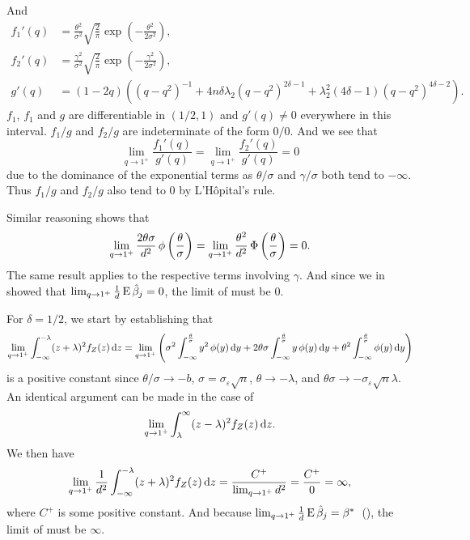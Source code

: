 And
\begin{align*}
  f_1'(q) & = \frac{\theta^2}{\sigma^2}\sqrt{\frac{2}{\pi}}\exp\left(-\frac{\theta^2}{2\sigma^2}\right),                                    \\
  f_2'(q) & = \frac{\gamma^2}{\sigma^2}\sqrt{\frac{2}{\pi}}\exp\left(-\frac{\gamma^2}{2\sigma^2}\right),                                    \\
  g'(q)   & = (1-2q)\left((q-q^2)^{-1} + 4n\delta \lambda_2 (q-q^2)^{2\delta - 1} + \lambda_2^2 (4 \delta - 1)(q-q^2)^{4\delta - 2}\right).
\end{align*}
\(f_1\), \(f_1\) and \(g\) are differentiable in \((1/2, 1)\) and \(g'(q) \neq 0\) everywhere in this interval. \(f_1/g\) and \(f_2/g\) are indeterminate of the form \(0/0\). And we see that
\[
  \lim_{q \rightarrow 1^+} \frac{f_1'(q)}{g'(q)} = \lim_{q \rightarrow 1^+} \frac{f_2'(q)}{g'(q)} = 0
\]
due to the dominance of the exponential terms as \(\theta/\sigma\) and \(\gamma/\sigma\)
both tend to \(-\infty\). Thus \(f_1/g\) and \(f_2/g\) also tend to 0 by L'Hôpital's rule.

Similar reasoning shows that
\[
  \lim_{q \rightarrow 1^+} \frac{2\theta \sigma}{d^2} \operatorname{\phi} \left(\frac{\theta}{\sigma}\right) = \lim_{q \rightarrow 1^+} \frac{\theta^2}{d^2} \operatorname{\Phi} \left(\frac{\theta}{\sigma}\right) = 0.
\]
The same result applies to the respective terms involving \(\gamma\). And since we in
 showed that \(\lim_{q\rightarrow 1^+} \frac{1}{d} \operatorname{E}
\hat{\beta}_j = 0\), the limit of  must be 0.

For \(\delta = 1/2\), we start by establishing that
\[
  \lim_{q \rightarrow 1^+} \int_{-\infty}^{-\lambda}(z+ \lambda)^2 f_Z(z) \mathop{}\!\mathrm{d} z = \lim_{q \rightarrow 1^+} \left(\sigma^2 \int_{-\infty}^\frac{\theta}{\sigma} y^2 \operatorname{\phi}(y) \mathop{}\!\mathrm{d} y + 2 \theta \sigma \int_{-\infty}^\frac{\theta}{\sigma} y \operatorname{\phi}(y) \mathop{}\!\mathrm{d} y + \theta^2 \int_{-\infty}^\frac{\theta}{\sigma} \operatorname{\phi}(y) \mathop{}\!\mathrm{d} y\right)
\]
is a positive constant since \(\theta/\sigma \rightarrow -b\), \(\sigma =
\sigma_\varepsilon \sqrt{n}\), \(\theta \rightarrow - \lambda\), and \(\theta\sigma
\rightarrow - \sigma_\varepsilon \sqrt{n}\lambda\). An identical argument can be made in
the case of
\[
  \lim_{q \rightarrow 1^+} \int_{\lambda}^{\infty}(z - \lambda)^2 f_Z(z) \mathop{}\!\mathrm{d} z.
\]
We then have
\[
  \lim_{q \rightarrow 1^+} \frac{1}{d^2} \int_{-\infty}^{-\lambda}(z+ \lambda)^2 f_Z(z) \mathop{}\!\mathrm{d} z = \frac{C^+}{\lim_{q\rightarrow 1^+} d^2} = \frac{C^+}{0} = \infty,
\]
where \(C^+\) is some positive constant. And because \(\lim_{q\rightarrow 1^+} \frac{1}{d}
\operatorname{E} \hat{\beta}_j = \beta^*\)~(), the limit of
 must be \(\infty\).

